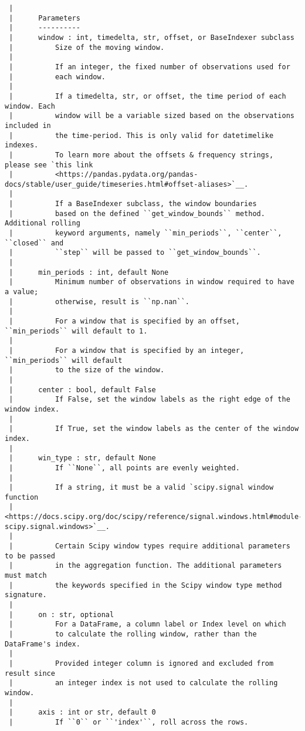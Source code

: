\documentclass[
  letterpaper,
  DIV=11,
  numbers=noendperiod]{scrreprt}
\begin{document}
\begin{verbatim}
 |      
 |      Parameters
 |      ----------
 |      window : int, timedelta, str, offset, or BaseIndexer subclass
 |          Size of the moving window.
 |      
 |          If an integer, the fixed number of observations used for
 |          each window.
 |      
 |          If a timedelta, str, or offset, the time period of each window. Each
 |          window will be a variable sized based on the observations included in
 |          the time-period. This is only valid for datetimelike indexes.
 |          To learn more about the offsets & frequency strings, please see `this link
 |          <https://pandas.pydata.org/pandas-docs/stable/user_guide/timeseries.html#offset-aliases>`__.
 |      
 |          If a BaseIndexer subclass, the window boundaries
 |          based on the defined ``get_window_bounds`` method. Additional rolling
 |          keyword arguments, namely ``min_periods``, ``center``, ``closed`` and
 |          ``step`` will be passed to ``get_window_bounds``.
 |      
 |      min_periods : int, default None
 |          Minimum number of observations in window required to have a value;
 |          otherwise, result is ``np.nan``.
 |      
 |          For a window that is specified by an offset, ``min_periods`` will default to 1.
 |      
 |          For a window that is specified by an integer, ``min_periods`` will default
 |          to the size of the window.
 |      
 |      center : bool, default False
 |          If False, set the window labels as the right edge of the window index.
 |      
 |          If True, set the window labels as the center of the window index.
 |      
 |      win_type : str, default None
 |          If ``None``, all points are evenly weighted.
 |      
 |          If a string, it must be a valid `scipy.signal window function
 |          <https://docs.scipy.org/doc/scipy/reference/signal.windows.html#module-scipy.signal.windows>`__.
 |      
 |          Certain Scipy window types require additional parameters to be passed
 |          in the aggregation function. The additional parameters must match
 |          the keywords specified in the Scipy window type method signature.
 |      
 |      on : str, optional
 |          For a DataFrame, a column label or Index level on which
 |          to calculate the rolling window, rather than the DataFrame's index.
 |      
 |          Provided integer column is ignored and excluded from result since
 |          an integer index is not used to calculate the rolling window.
 |      
 |      axis : int or str, default 0
 |          If ``0`` or ``'index'``, roll across the rows.

\end{verbatim}
\end{document}
